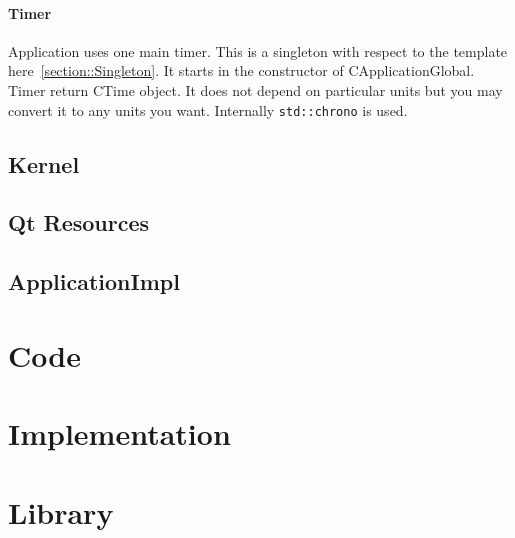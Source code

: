 \documentclass{article}
\begin{document}
\paragraph{Timer}

Application uses one main timer. This is a singleton with respect to the template here~\ref{section::Singleton}. It starts in the constructor of CApplicationGlobal. Timer return CTime object. It does not depend on particular units but you may convert it to any units you want. Internally \verb"std::chrono" is used.

\subsection{Kernel}

\subsection{Qt Resources}

\subsection{ApplicationImpl}


\section{Code}

\section{Implementation}

\section{Library}
\end{document}

